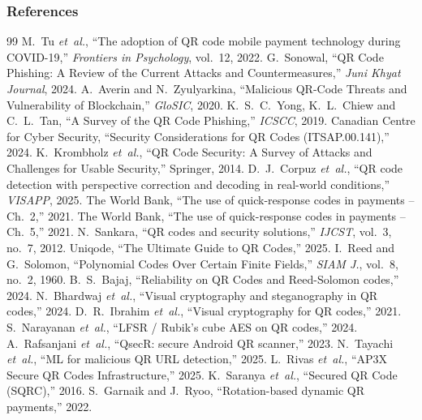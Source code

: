 \documentclass{beamer}
\begin{document}
\begin{frame}[allowframebreaks]
  \frametitle{References}
  \scriptsize
  \begin{thebibliography}{99}
     M.~Tu \emph{et~al.}, ``The adoption of QR code mobile payment technology during COVID-19,'' \emph{Frontiers in Psychology}, vol.~12, 2022.
     G.~Sonowal, ``QR Code Phishing: A Review of the Current Attacks and Countermeasures,'' \emph{Juni Khyat Journal}, 2024.
     A.~Averin and N.~Zyulyarkina, ``Malicious QR-Code Threats and Vulnerability of Blockchain,'' \emph{GloSIC}, 2020.
     K.~S.~C.~Yong, K.~L.~Chiew and C.~L.~Tan, ``A Survey of the QR Code Phishing,'' \emph{ICSCC}, 2019.
     Canadian Centre for Cyber Security, ``Security Considerations for QR Codes (ITSAP.00.141),'' 2024.
     K.~Krombholz \emph{et~al.}, ``QR Code Security: A Survey of Attacks and Challenges for Usable Security,'' Springer, 2014.
     D.~J.~Corpuz \emph{et~al.}, ``QR code detection with perspective correction and decoding in real-world conditions,'' \emph{VISAPP}, 2025.
     The World Bank, ``The use of quick-response codes in payments -- Ch.~2,'' 2021.
     The World Bank, ``The use of quick-response codes in payments -- Ch.~5,'' 2021.
     N.~Sankara, ``QR codes and security solutions,'' \emph{IJCST}, vol.~3, no.~7, 2012.
     Uniqode, ``The Ultimate Guide to QR Codes,'' 2025.
     I.~Reed and G.~Solomon, ``Polynomial Codes Over Certain Finite Fields,'' \emph{SIAM J.}, vol.~8, no.~2, 1960.
     B.~S.~Bajaj, ``Reliability on QR Codes and Reed-Solomon codes,'' 2024.
     N.~Bhardwaj \emph{et~al.}, ``Visual cryptography and steganography in QR codes,'' 2024.
     D.~R.~Ibrahim \emph{et~al.}, ``Visual cryptography for QR codes,'' 2021.
     S.~Narayanan \emph{et~al.}, ``LFSR / Rubik's cube AES on QR codes,'' 2024.
     A.~Rafsanjani \emph{et~al.}, ``QsecR: secure Android QR scanner,'' 2023.
     N.~Tayachi \emph{et~al.}, ``ML for malicious QR URL detection,'' 2025.
     L.~Rivas \emph{et~al.}, ``AP3X Secure QR Codes Infrastructure,'' 2025.
     K.~Saranya \emph{et~al.}, ``Secured QR Code (SQRC),'' 2016.
     S.~Garnaik and J.~Ryoo, ``Rotation-based dynamic QR payments,'' 2022.

\end{thebibliography}
\end{frame}
\end{document}
